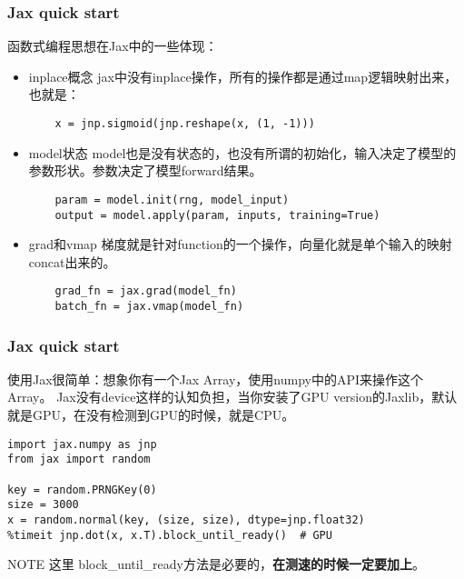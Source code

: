 \documentclass{beamer}
\begin{document}
\begin{frame}[fragile]
\frametitle{Jax quick start}

函数式编程思想在Jax中的一些体现：

\begin{itemize}
    \item<1-> inplace概念\newline
    jax中没有inplace操作，所有的操作都是通过map逻辑映射出来，也就是：
    \begin{verbatim}
    x = jnp.sigmoid(jnp.reshape(x, (1, -1)))
    \end{verbatim}
    \item<2-> model状态\newline
    model也是没有状态的，也没有所谓的初始化，输入决定了模型的参数形状。参数决定了模型forward结果。
    \begin{verbatim}
    param = model.init(rng, model_input)
    output = model.apply(param, inputs, training=True)
    \end{verbatim}
    \item<3-> grad和vmap\newline
    梯度就是针对function的一个操作，向量化就是单个输入的映射concat出来的。
    \begin{verbatim}
    grad_fn = jax.grad(model_fn)
    batch_fn = jax.vmap(model_fn)
    \end{verbatim}
\end{itemize}
\end{frame}


\begin{frame}[fragile]
\frametitle{Jax quick start}

使用Jax很简单：想象你有一个Jax Array，使用numpy中的API来操作这个Array。\newline
Jax没有device这样的认知负担，当你安装了GPU version的Jaxlib，默认就是GPU，在没有检测到GPU的时候，就是CPU。

\begin{verbatim}
import jax.numpy as jnp
from jax import random

key = random.PRNGKey(0)
size = 3000
x = random.normal(key, (size, size), dtype=jnp.float32)
%timeit jnp.dot(x, x.T).block_until_ready()  # GPU
\end{verbatim}

\begin{block}{NOTE}
这里 block\_until\_ready方法是必要的，\textbf{在测速的时候一定要加上}。
\end{block}

\end{frame}
\end{document}

